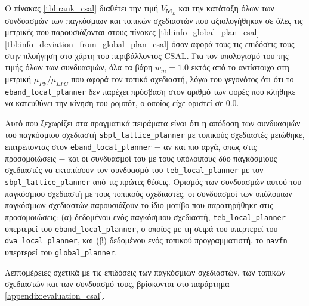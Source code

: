 Ο πίνακας \ref{tbl:rank_csal} διαθέτει την τιμή $V_{\bm{M}_L}$ και την κατάταξη όλων των
συνδυασμών των παγκόσμιων και τοπικών σχεδιαστών που αξιολογήθηκαν σε όλες τις μετρικές
που παρουσιάζονται στους πίνακες \ref{tbl:info_global_plan_csal} $-$
\ref{tbl:info_deviation_from_global_plan_csal} όσον αφορά τους
τις επιδόσεις τους στην πλοήγηση στο χάρτη του περιβάλλοντος CSAL. Για τον υπολογισμό του
της τιμής όλων των συνδυασμών, όλα τα βάρη $w_m = 1.0$ εκτός από το αντίστοιχο
στη μετρική $\mu_{PF} / \mu_{LPC}$ που αφορά τον τοπικό σχεδιαστή, λόγω του γεγονότος ότι
ότι το \texttt{eband\_local\_planner} δεν παρέχει πρόσβαση στον αριθμό των
φορές που κλήθηκε να κατευθύνει την κίνηση του ρομπότ, ο οποίος είχε οριστεί σε $0.0$.

Αυτό που ξεχωρίζει στα πραγματικά πειράματα είναι ότι η απόδοση των συνδυασμών
του παγκόσμιου σχεδιαστή \texttt{sbpl\_lattice\_planner} με τοπικούς σχεδιαστές μειώθηκε,
επιτρέποντας στον \texttt{eband\_local\_planner} $-$ αν και πιο αργά, όπως στις προσομοιώσεις
$-$ και οι συνδυασμοί του με τους υπόλοιπους δύο παγκόσμιους σχεδιαστές να εκτοπίσουν
τον συνδυασμό του \texttt{teb\_local\_planner} με τον \texttt{sbpl\_lattice\_planner}
από τις πρώτες θέσεις. Ορισμός των συνδυασμών αυτού του παγκόσμιου σχεδιαστή
με τους τοπικούς σχεδιαστές, οι συνδυασμοί των υπόλοιπων παγκόσμιων σχεδιαστών
παρουσιάζουν το ίδιο μοτίβο που παρατηρήθηκε στις προσομοιώσεις: (α) δεδομένου ενός παγκόσμιου σχεδιαστή,
\texttt{teb\_local\_planner} υπερτερεί του \texttt{eband\_local\_planner}, ο οποίος
με τη σειρά του υπερτερεί του \texttt{dwa\_local\_planner}, και (β) δεδομένου ενός τοπικού
προγραμματιστή, το \texttt{navfn} υπερτερεί του \texttt{global\_planner}.

Λεπτομέρειες σχετικά με τις επιδόσεις των παγκόσμιων σχεδιαστών, των τοπικών σχεδιαστών και των
συνδυασμό τους, βρίσκονται στο παράρτημα \ref{appendix:evaluation_csal}.

